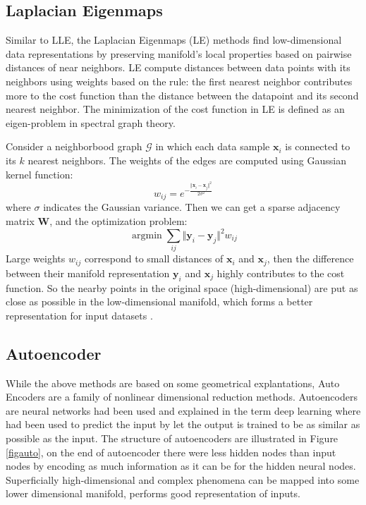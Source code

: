 \documentclass[journal]{IEEEtran}
\DeclareMathOperator*{\argmin}{argmin}
\begin{document}
%
%
\subsection{Laplacian Eigenmaps}
Similar to LLE, the Laplacian Eigenmaps (LE) methods find low-dimensional data representations by preserving manifold's local properties based on pairwise distances of near neighbors.
LE compute distances between data points with its neighbors using weights based on the rule: the first nearest neighbor contributes more to the cost function than the distance between the datapoint and its second nearest neighbor.
The minimization of the cost function in LE is defined as an eigen-problem in spectral graph theory.
 
Consider a neighborbood graph $\mathcal{G}$ in which each data sample $\bm{x}_i$ is connected to its $k$ nearest neighbors.
The weights of the edges are computed using Gaussian kernel function:
\begin{equation}
w_{ij} = e^{-\frac{\Vert \bm{x}_i - \bm{x}_j \Vert^2}{2\sigma^2}}
\end{equation}
where $\sigma$ indicates the Gaussian variance.
Then we can get a sparse adjacency matrix $\bm{W}$, and the optimization problem:
\begin{equation}
\argmin \sum_{ij} \Vert\bm{y}_i - \bm{y}_j \Vert^2 w_{ij}
\end{equation}
Large weights $w_{ij}$ correspond to small distances of $\bm{x}_i$ and $\bm{x}_j$, then the difference between their manifold representation $\bm{y}_i$ and $\bm{x}_j$ highly contributes to the cost function.
So the nearby points in the original space (high-dimensional) are put as close as possible in the low-dimensional manifold, which forms a better representation for input datasets \cite{belkin2003laplacian}.

%
%
\subsection{Autoencoder}
While the above methods are based on some geometrical explantations, Auto Encoders are a family of nonlinear dimensional reduction methods.
Autoencoders are neural networks had been used and explained in the term deep learning where had been used to predict the input by let the output is trained to be as similar as possible as the input.
The structure of autoencoders are illustrated in Figure \ref{figauto}, on the end of autoencoder there were less hidden nodes than input nodes by encoding as much information as it can be for the hidden neural nodes. 
Superficially high-dimensional and complex phenomena can be mapped into some lower dimensional manifold, performs good representation of inputs.
 
\end{document}
